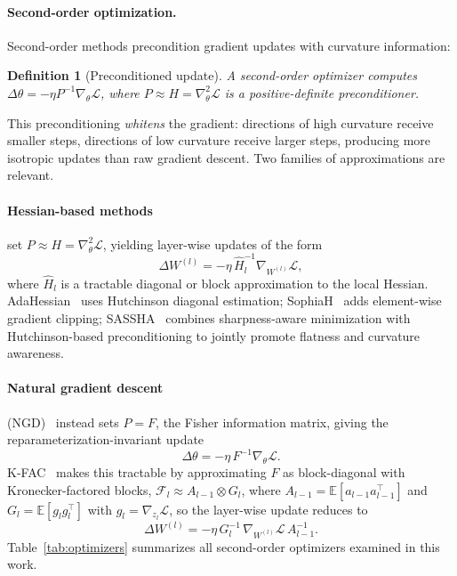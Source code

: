\documentclass{article}
\newtheorem{definition}{Definition}
\newcommand{\EE}{\mathbb{E}}
\newcommand{\cL}{\mathcal{L}}
\begin{document}
\paragraph{Second-order optimization.}
Second-order methods precondition gradient updates with curvature information:
\begin{definition}[Preconditioned update]
A second-order optimizer computes $\Delta \theta = -\eta P^{-1} \nabla_\theta \cL$, where $P \approx H = \nabla^2_\theta \cL$ is a positive-definite preconditioner.
\end{definition}
This preconditioning \emph{whitens} the gradient: directions of high curvature receive smaller steps, directions of low curvature receive larger steps, producing more isotropic updates than raw gradient descent. Two families of approximations are relevant.

\paragraph{Hessian-based methods} set $P \approx H = \nabla^2_\theta \cL$, yielding
layer-wise updates of the form
\[
    \Delta W^{(l)} = -\eta\, \widehat{H}_l^{-1} \nabla_{W^{(l)}} \cL,
\]
where $\widehat{H}_l$ is a tractable diagonal or block approximation to the
local Hessian. AdaHessian~\citep{yao2021adahessian} uses Hutchinson diagonal
estimation; SophiaH~\citep{liu2023sophia} adds element-wise gradient clipping;
SASSHA~\citep{shin2025sassha} combines sharpness-aware minimization with
Hutchinson-based preconditioning to jointly promote flatness and curvature
awareness.
\paragraph{Natural gradient descent} (NGD)~\citep{amari1998natural} instead sets
$P = F$, the Fisher information matrix, giving the
reparameterization-invariant update
\[
    \Delta\theta = -\eta\, F^{-1} \nabla_\theta \cL.
\]
K-FAC~\citep{martens2015optimizing} makes this tractable by approximating $F$
as block-diagonal with Kronecker-factored blocks,
$\mathcal{F}_l \approx A_{l-1} \otimes G_l$, where
$A_{l-1} = \EE[a_{l-1}a_{l-1}^\top]$ and $G_l = \EE[g_l g_l^\top]$ with
$g_l = \nabla_{z_l}\cL$, so the layer-wise update reduces to
\[
    \Delta W^{(l)} = -\eta\, G_l^{-1}\, \nabla_{W^{(l)}} \cL\, A_{l-1}^{-1}.
\]
Table~\ref{tab:optimizers} summarizes all second-order optimizers examined in this work.
\end{document}
